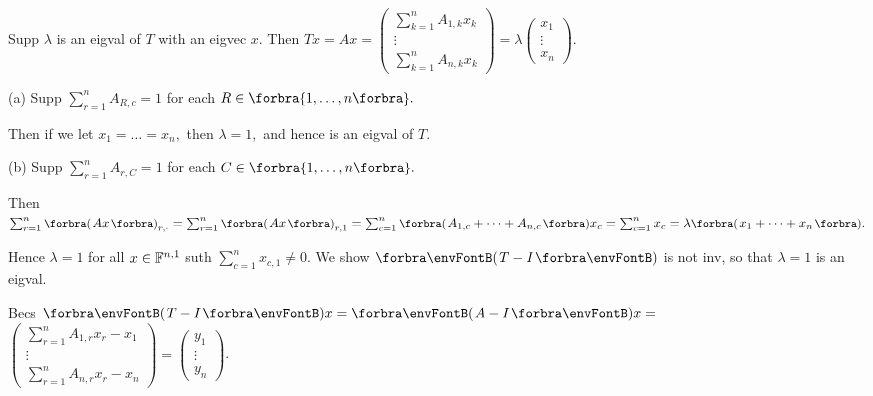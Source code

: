 \vspace{-8pt}\par\quad
Supp $\lambda$ is an eigval of $T$ with an eigvec $x.$ Then $Tx=Ax={}${\normalsize$\begin{pmatrix} \sum_{k=1}^n A_{1,k}x_k\\ \vdots\\ \sum_{k=1}^n A_{n,k}x_k\end{pmatrix}$}${}=\lambda ${\normalsize$\begin{pmatrix} x_1\\ \vdots\\ x_n\end{pmatrix}$}.\vspace{-6pt}\par\quad
(a) Supp $\sum_{r=1}^n A_{R,c}=1$ for each $R\in\Bra{1,\dots,n}.$\par\quad\Ha
Then if we let $x_1=\dots=x_n,$ then $\lambda=1,$ and hence is an eigval of $T.$\par\vspace{10pt}\quad
(b) Supp $\sum_{r=1}^n A_{r,C}=1$ for each $C\in\Bra{1,\dots,n}.$\vspace{4pt}\par\quad\Hb
Then $\sum_{r=1}^n \BigPar{Ax}_{r,\cdot}=\sum_{r=1}^n \BigPar{Ax}_{r,1}=\sum_{c=1}^n\BigPar{A_{1,c}+\dots+A_{n,c}}x_c=\sum_{c=1}^n x_c=\lambda\BigPar{x_1+\dots+x_n}.$\vspace{4pt}\par\quad\Hb
Hence $\lambda=1$ for all $x\in{\mathbb{F}}^{n,1}$ suth $\sum_{c=1}^n x_{c,1}\neq 0.$\PfEnd\vspace{10pt}\quad\Hb
\Or We show $\Par{T-I}$ is not inv, so that $\lambda=1$ is an eigval.\vspace{2pt}\par\quad\Hb
Becs $\Par{T-I}x=\Par{A-I}x={}${\small$\begin{pmatrix} \sum_{r=1}^n A_{1,r}x_r-x_1\\ \vdots\\ \sum_{r=1}^n A_{n,r}x_r-x_n\end{pmatrix}=\begin{pmatrix} y_1\\ \vdots\\ y_n\end{pmatrix}$}.\vspace{4pt}\par\quad\Hb
